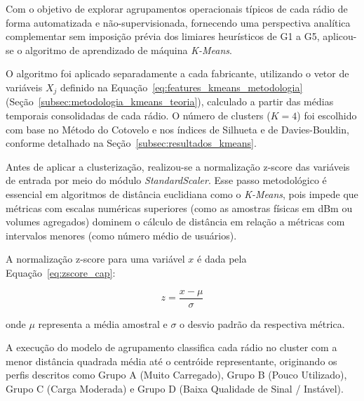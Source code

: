 Com o objetivo de explorar agrupamentos operacionais típicos de cada rádio de forma automatizada e não-supervisionada, fornecendo uma perspectiva analítica complementar sem imposição prévia dos limiares heurísticos de G1 a G5, aplicou-se o algoritmo de aprendizado de máquina \textit{K-Means}. 

O algoritmo foi aplicado separadamente a cada fabricante, utilizando o vetor de variáveis $X_j$ definido na Equação~\ref{eq:features_kmeans_metodologia} (Seção~\ref{subsec:metodologia_kmeans_teoria}), calculado a partir das médias temporais consolidadas de cada rádio. O número de clusters ($K=4$) foi escolhido com base no Método do Cotovelo e nos índices de Silhueta e de Davies-Bouldin, conforme detalhado na Seção~\ref{subsec:resultados_kmeans}.

Antes de aplicar a clusterização, realizou-se a normalização z-score das variáveis de entrada por meio do módulo \textit{StandardScaler}. Esse passo metodológico é essencial em algoritmos de distância euclidiana como o \textit{K-Means}, pois impede que métricas com escalas numéricas superiores (como as amostras físicas em dBm ou volumes agregados) dominem o cálculo de distância em relação a métricas com intervalos menores (como número médio de usuários).

A normalização z-score para uma variável $x$ é dada pela Equação~\ref{eq:zscore_cap}:

\begin{equation}
\label{eq:zscore_cap}
z = \frac{x - \mu}{\sigma}
\end{equation}

onde $\mu$ representa a média amostral e $\sigma$ o desvio padrão da respectiva métrica.

A execução do modelo de agrupamento classifica cada rádio no cluster com a menor distância quadrada média até o centróide representante, originando os perfis descritos como Grupo A (Muito Carregado), Grupo B (Pouco Utilizado), Grupo C (Carga Moderada) e Grupo D (Baixa Qualidade de Sinal / Instável).


